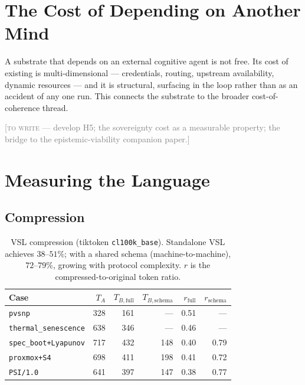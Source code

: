 \documentclass[12pt]{article}
\newcommand{\TODO}[1]{\medskip\noindent\textcolor{gray}{\small[\textsc{to write} --- #1]}\medskip}
\begin{document}
\section{The Cost of Depending on Another Mind}
\label{sec:sovereignty}


A substrate that depends on an external cognitive agent is not free. Its cost of existing
is multi-dimensional --- credentials, routing, upstream availability, dynamic resources
--- and it is structural, surfacing in the loop rather than as an accident of any one
run. This connects the substrate to the broader cost-of-coherence thread.

\TODO{develop H5; the sovereignty cost as a measurable property; the bridge to the
epistemic-viability companion paper.}

\section{Measuring the Language}
\label{sec:measuring}

\subsection{Compression}
\label{sec:compression}


\begin{table}[!htb]
\centering
\begin{tabular}{lrrrrr}
\toprule
Case & $T_A$ & $T_{B,\text{full}}$ & $T_{B,\text{schema}}$ & $r_\text{full}$ & $r_\text{schema}$ \\
\midrule
\texttt{pvsnp}               & 328 & 161 & ---  & 0.51 & ---  \\
\texttt{thermal\_senescence} & 638 & 346 & ---  & 0.46 & ---  \\
\texttt{spec\_boot+Lyapunov} & 717 & 432 & 148  & 0.40 & 0.79 \\
\texttt{proxmox+S4}          & 698 & 411 & 198  & 0.41 & 0.72 \\
\texttt{PSI/1.0}             & 641 & 397 & 147  & 0.38 & 0.77 \\
\bottomrule
\end{tabular}
\caption{VSL compression (tiktoken \texttt{cl100k\_base}). Standalone VSL achieves
$38$--$51\%$; with a shared schema (machine-to-machine), $72$--$79\%$, growing with
protocol complexity. $r$ is the compressed-to-original token ratio.}
\label{tab:compression}
\end{table}
\end{document}
